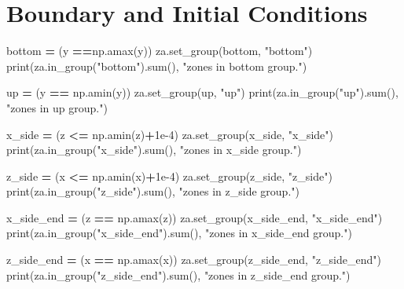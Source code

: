 \documentclass[a4paper, nobind]{templates/ociamthesis}
\newenvironment{Shaded}{\begin{snugshade}}{\end{snugshade}}
\newcommand{\BuiltInTok}[1]{#1}
\newcommand{\FloatTok}[1]{\textcolor[rgb]{0.00,0.00,0.81}{#1}}
\newcommand{\NormalTok}[1]{#1}
\newcommand{\OperatorTok}[1]{\textcolor[rgb]{0.81,0.36,0.00}{\textbf{#1}}}
\newcommand{\StringTok}[1]{\textcolor[rgb]{0.31,0.60,0.02}{#1}}
\renewenvironment{Shaded}
{
  \vspace{10pt}%
  \begin{snugshade}%
}{%
  \end{snugshade}%
  \vspace{8pt}%
}
\begin{document}
\hypertarget{boundary-and-initial-conditions}{%
\section{Boundary and Initial Conditions}\label{boundary-and-initial-conditions}}

\begin{Shaded}
\begin{Highlighting}[]
\NormalTok{bottom }\OperatorTok{=}\NormalTok{ (y }\OperatorTok{==}\NormalTok{np.amax(y))}
\NormalTok{za.set\_group(bottom, }\StringTok{"bottom"}\NormalTok{)}
\BuiltInTok{print}\NormalTok{(za.in\_group(}\StringTok{"bottom"}\NormalTok{).}\BuiltInTok{sum}\NormalTok{(), }\StringTok{"zones in bottom group."}\NormalTok{)}

\NormalTok{up }\OperatorTok{=}\NormalTok{ (y }\OperatorTok{==}\NormalTok{ np.amin(y))}
\NormalTok{za.set\_group(up, }\StringTok{"up"}\NormalTok{)}
\BuiltInTok{print}\NormalTok{(za.in\_group(}\StringTok{"up"}\NormalTok{).}\BuiltInTok{sum}\NormalTok{(), }\StringTok{"zones in up group."}\NormalTok{)}

\NormalTok{x\_side }\OperatorTok{=}\NormalTok{ (z }\OperatorTok{\textless{}=}\NormalTok{ np.amin(z)}\OperatorTok{+}\FloatTok{1e{-}4}\NormalTok{)}
\NormalTok{za.set\_group(x\_side, }\StringTok{"x\_side"}\NormalTok{)}
\BuiltInTok{print}\NormalTok{(za.in\_group(}\StringTok{"x\_side"}\NormalTok{).}\BuiltInTok{sum}\NormalTok{(), }\StringTok{"zones in x\_side group."}\NormalTok{)}

\NormalTok{z\_side }\OperatorTok{=}\NormalTok{ (x }\OperatorTok{\textless{}=}\NormalTok{ np.amin(x)}\OperatorTok{+}\FloatTok{1e{-}4}\NormalTok{)}
\NormalTok{za.set\_group(z\_side, }\StringTok{"z\_side"}\NormalTok{)}
\BuiltInTok{print}\NormalTok{(za.in\_group(}\StringTok{"z\_side"}\NormalTok{).}\BuiltInTok{sum}\NormalTok{(), }\StringTok{"zones in z\_side group."}\NormalTok{)}

\NormalTok{x\_side\_end }\OperatorTok{=}\NormalTok{ (z }\OperatorTok{==}\NormalTok{ np.amax(z))}
\NormalTok{za.set\_group(x\_side\_end, }\StringTok{"x\_side\_end"}\NormalTok{)}
\BuiltInTok{print}\NormalTok{(za.in\_group(}\StringTok{"x\_side\_end"}\NormalTok{).}\BuiltInTok{sum}\NormalTok{(), }\StringTok{"zones in x\_side\_end group."}\NormalTok{)}

\NormalTok{z\_side\_end }\OperatorTok{=}\NormalTok{ (x }\OperatorTok{==}\NormalTok{ np.amax(x))}
\NormalTok{za.set\_group(z\_side\_end, }\StringTok{"z\_side\_end"}\NormalTok{)}
\BuiltInTok{print}\NormalTok{(za.in\_group(}\StringTok{"z\_side\_end"}\NormalTok{).}\BuiltInTok{sum}\NormalTok{(), }\StringTok{"zones in z\_side\_end group."}\NormalTok{)}


\end{Highlighting}
\end{Shaded}
\end{document}
